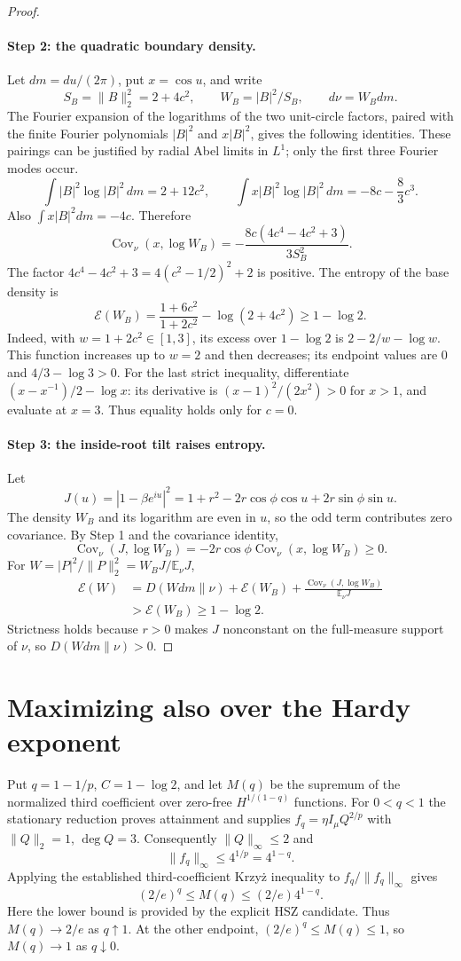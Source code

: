 \begin{proof}
\paragraph{Step 2: the quadratic boundary density.}
Let $dm=du/(2\pi)$, put $x=\cos u$, and write
\[
 S_B=\|B\|_2^2=2+4c^2,\qquad W_B=|B|^2/S_B,\qquad d\nu=W_Bdm.
\]
The Fourier expansion of the logarithms of the two unit-circle factors, paired with the finite Fourier polynomials $|B|^2$ and $x|B|^2$, gives
the following identities. These pairings can be justified by radial Abel
limits in $L^1$; only the first three Fourier modes occur.
\[
 \int |B|^2\log|B|^2\,dm=2+12c^2,
 \qquad
 \int x|B|^2\log|B|^2\,dm=-8c-\frac83c^3.
\]
Also $\int x|B|^2dm=-4c$. Therefore
\[
 \operatorname{Cov}_{\nu}(x,\log W_B)
 =-\frac{8c(4c^4-4c^2+3)}{3S_B^2}.
\]
The factor $4c^4-4c^2+3=4(c^2-1/2)^2+2$ is positive.
The entropy of the base density is
\[
 \mathcal E(W_B)=\frac{1+6c^2}{1+2c^2}-\log(2+4c^2)\ge1-\log2.
\]
Indeed, with $w=1+2c^2\in[1,3]$, its excess over $1-\log2$ is
$2-2/w-\log w$. This function increases up to $w=2$ and then decreases; its endpoint values are $0$ and $4/3-\log3>0$.
For the last strict inequality, differentiate
$(x-x^{-1})/2-\log x$: its derivative is $(x-1)^2/(2x^2)>0$
for $x>1$, and evaluate at $x=3$. Thus equality holds only for $c=0$.

\paragraph{Step 3: the inside-root tilt raises entropy.}
Let
\[
 J(u)=|1-\beta e^{iu}|^2
 =1+r^2-2r\cos\phi\cos u+2r\sin\phi\sin u.
\]
The density $W_B$ and its logarithm are even in $u$, so the odd term contributes zero covariance. By Step 1 and the covariance identity,
\[
 \operatorname{Cov}_{\nu}(J,\log W_B)
 =-2r\cos\phi\operatorname{Cov}_{\nu}(x,\log W_B)\ge0.
\]
For $W=|P|^2/\|P\|_2^2=W_BJ/\mathbb E_\nu J$,
\begin{align*}
 \mathcal E(W)
 &=D(Wdm\|\nu)+\mathcal E(W_B)
   +\frac{\operatorname{Cov}_\nu(J,\log W_B)}{\mathbb E_\nu J}\\
 &>\mathcal E(W_B)\ge1-\log2.
\end{align*}
Strictness holds because $r>0$ makes $J$ nonconstant on the full-measure support of $\nu$, so $D(Wdm\|\nu)>0$.

\end{proof}
\section{Maximizing also over the Hardy exponent}\label{sec:joint}
Put $q=1-1/p$, $C=1-\log2$, and let $M(q)$ be the supremum of the
normalized third coefficient over zero-free $H^{1/(1-q)}$ functions.
For $0<q<1$ the stationary reduction proves attainment and supplies
$f_q=\eta I_\mu Q^{2/p}$ with $\|Q\|_2=1$, $\deg Q=3$.
Consequently $\|Q\|_\infty\leq2$ and
\[
 \|f_q\|_\infty\leq4^{1/p}=4^{1-q}.
\]
Applying the established third-coefficient Krzy\.{z} inequality to
$f_q/\|f_q\|_\infty$ gives
\[
 (2/e)^q\leq M(q)\leq (2/e)4^{1-q}.
\]
Here the lower bound is provided by the explicit HSZ candidate.
Thus $M(q)\to2/e$ as $q\uparrow1$. At the other endpoint,
$(2/e)^q\leq M(q)\leq1$, so $M(q)\to1$ as $q\downarrow0$.


